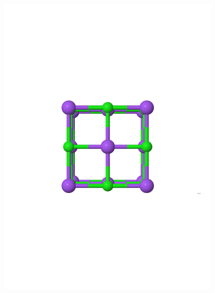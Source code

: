 \documentclass[11pt,oneside,czech,american]{book} %
\theoremstyle{plain}
\theoremstyle{definition}
\begin{document}
\begin{figure}[H]       
	\includegraphics[scale=0.26]{rocksalt_nolabels.pdf}

\end{figure}
\end{document}
